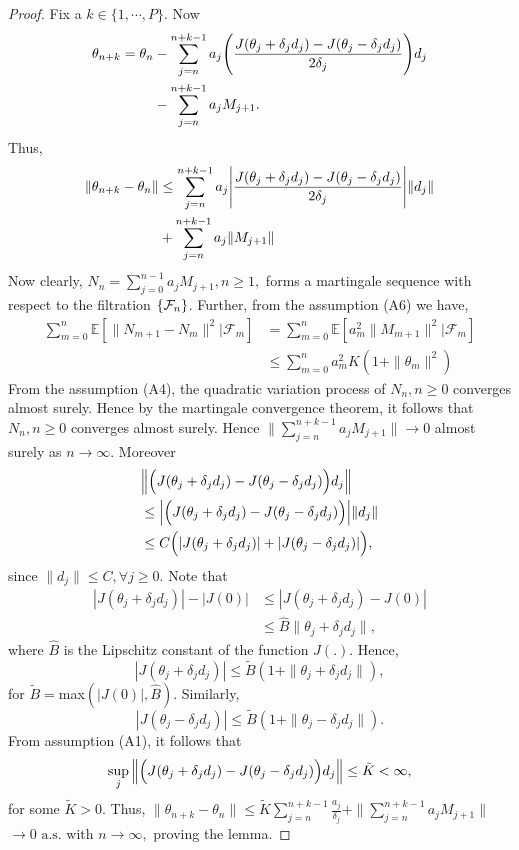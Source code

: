 \begin{proof}
 Fix a $k \in \{1,\cdots,P \}.$ Now
 \begin{align*}
 \begin{split}
 \theta_{n+k} = \theta_n & -\sum_{j=n}^{n+k-1}a_j\Bigg{(}\frac{J(\theta_j+\delta_j d_j)-J(\theta_j-\delta_j d_j)}{2\delta_j}\Bigg{)}d_j \\ 
  &-\sum_{j=n}^{n+k-1}a_jM_{j+1}.
 \end{split}
 \end{align*}
 Thus,
 \begin{align*}
 \begin{split}
 \|\theta_{n+k}-\theta_n\| &\leq \sum_{j=n}^{n+k-1}a_j\Bigg{|}\frac{J(\theta_j+\delta_{j} d_j)-J(\theta_j-\delta_{j} d_j)}{2\delta_j}\Bigg{|}\|d_j\|\\
 &+\sum_{j=n}^{n+k-1}a_j\|M_{j+1}\|
\end{split}
\end{align*}
Now clearly,
$N_n=\sum\limits_{j=0}^{n-1}a_jM_{j+1}, n\geq1,$
forms a martingale sequence with respect to the filtration $\{\mathcal{F}_n\}$.
Further, from the assumption (A6) we have,
\begin{align*}
\sum_{m=0}^{n}\mathbb{E}[\|N_{m+1}-N_{m}\|^2|\mathcal{F}_{m}]& =\sum_{m=0}^{n}\mathbb{E}[a_{m}^2\|M_{m+1}\|^2|\mathcal{F}_{m}]\\
& \leq \sum_{m=0}^{n}a_{m}^2K(1+\|\theta_m\|^2)
\end{align*}
From the assumption (A4), the quadratic variation process of $N_n,n\geq0$ converges 
almost surely. Hence by the martingale convergence theorem, it follows that 
$N_n, n\geq0$ converges almost surely. Hence
$\|\sum\limits_{j=n}^{n+k-1}a_jM_{j+1}\|\rightarrow 0$ almost surely as $n\rightarrow \infty.$
Moreover
\begin{align*}
&\Big{\|}\Big{(}J(\theta_j+\delta_j d_j)-J(\theta_j-\delta_j d_j)\Big{)}d_j\Big{\|} \\
& \leq \Big{|}\Big{(}J(\theta_j+\delta_j d_j)-J(\theta_j-\delta_j d_j)\Big{)}\Big{|}\|d_j\|\\
& \leq C \Big{(}|J(\theta_j+\delta_j d_j)|+|J(\theta_j-\delta_j d_j)|\Big{)},
\end{align*}
since $\|d_j\|\leq C, \forall j \geq0.$
Note that
\begin{align*}
|J(\theta_j+\delta_j d_j)|-|J(0)| & \leq|J(\theta_j+\delta_j d_j)-J(0)| \\
& \leq \hat{B} \|\theta_j+\delta_j d_j\|,
\end{align*}
where $\hat{B}$ is the Lipschitz constant of the function $J(.).$ Hence,
$$|J(\theta_j+\delta_j d_j)|\leq \tilde{B}(1+\|\theta_j+\delta_j d_j\|),$$
for $\tilde{B}=$max$(|J(0)|,\hat{B}).$ Similarly,
$$|J(\theta_j-\delta_j d_j)|\leq \tilde{B}(1+\|\theta_j-\delta_j d_j\|).$$
From assumption (A1), it follows that
$$\sup_j\Big{\|}\Big{(}J(\theta_j+\delta_j d_j)-J(\theta_j-\delta_j d_j)\Big{)}d_j\Big{\|}\leq \tilde{K}<\infty,$$
for some $\tilde{K}>0.$ Thus,
\newline
$\|\theta_{n+k}-\theta_n\| \leq \tilde{K}\sum\limits_{j=n}^{n+k-1}\frac{a_j}{\delta_j}+\|\sum_{j=n}^{n+k-1}a_jM_{j+1}\|$
\newline
$\rightarrow 0 \text{ a.s. with } n \rightarrow \infty,$
proving the lemma.
\end{proof}
